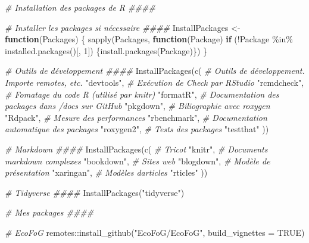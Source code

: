 \documentclass[
  11pt,
  french,
  a4paper,
  extrafontsizes,onecolumn,openright
  ]{memoir}
\newenvironment{Shaded}{\begin{snugshade}}{\end{snugshade}}
\newcommand{\AttributeTok}[1]{\textcolor[rgb]{0.77,0.63,0.00}{#1}}
\newcommand{\CommentTok}[1]{\textcolor[rgb]{0.56,0.35,0.01}{\textit{#1}}}
\newcommand{\ConstantTok}[1]{\textcolor[rgb]{0.00,0.00,0.00}{#1}}
\newcommand{\ControlFlowTok}[1]{\textcolor[rgb]{0.13,0.29,0.53}{\textbf{#1}}}
\newcommand{\DecValTok}[1]{\textcolor[rgb]{0.00,0.00,0.81}{#1}}
\newcommand{\FunctionTok}[1]{\textcolor[rgb]{0.00,0.00,0.00}{#1}}
\newcommand{\NormalTok}[1]{#1}
\newcommand{\OtherTok}[1]{\textcolor[rgb]{0.56,0.35,0.01}{#1}}
\newcommand{\SpecialCharTok}[1]{\textcolor[rgb]{0.00,0.00,0.00}{#1}}
\newcommand{\StringTok}[1]{\textcolor[rgb]{0.31,0.60,0.02}{#1}}
\begin{document}
\begin{Shaded}
\begin{Highlighting}[]
\CommentTok{\# Installation des packages de R \#\#\#\#}

\CommentTok{\# Installer les packages si nécessaire \#\#\#\#}
\NormalTok{InstallPackages }\OtherTok{\textless{}{-}} \ControlFlowTok{function}\NormalTok{(Packages) \{}
  \FunctionTok{sapply}\NormalTok{(Packages, }\ControlFlowTok{function}\NormalTok{(Package) }
    \ControlFlowTok{if}\NormalTok{ (}\SpecialCharTok{!}\NormalTok{Package }\SpecialCharTok{\%in\%} \FunctionTok{installed.packages}\NormalTok{()[, }\DecValTok{1}\NormalTok{]) }
\NormalTok{      \{}\FunctionTok{install.packages}\NormalTok{(Package)\})}
\NormalTok{\}}


\CommentTok{\# Outils de développement \#\#\#\#}
\FunctionTok{InstallPackages}\NormalTok{(}\FunctionTok{c}\NormalTok{(}
  \CommentTok{\# Outils de développement. Importe remotes, etc.}
  \StringTok{"devtools"}\NormalTok{,}
  \CommentTok{\# Exécution de Check par RStudio}
  \StringTok{"rcmdcheck"}\NormalTok{,}
  \CommentTok{\# Fomatage du code R (utilisé par knitr)}
  \StringTok{"formatR"}\NormalTok{,}
  \CommentTok{\# Documentation des packages dans /docs sur GitHub}
  \StringTok{"pkgdown"}\NormalTok{,}
  \CommentTok{\# Biliographie avec roxygen}
  \StringTok{"Rdpack"}\NormalTok{,}
  \CommentTok{\# Mesure des performances}
  \StringTok{"rbenchmark"}\NormalTok{,}
  \CommentTok{\# Documentation automatique des packages}
  \StringTok{"roxygen2"}\NormalTok{,}
  \CommentTok{\# Tests des packages}
  \StringTok{"testthat"}
\NormalTok{  ))}

\CommentTok{\# Markdown \#\#\#\#}
\FunctionTok{InstallPackages}\NormalTok{(}\FunctionTok{c}\NormalTok{(}
  \CommentTok{\# Tricot}
  \StringTok{"knitr"}\NormalTok{,}
  \CommentTok{\# Documents markdown complexes}
  \StringTok{"bookdown"}\NormalTok{,}
  \CommentTok{\# Sites web}
  \StringTok{"blogdown"}\NormalTok{,}
  \CommentTok{\# Modèle de présentation}
  \StringTok{"xaringan"}\NormalTok{,}
  \CommentTok{\# Modèles d\textquotesingle{}articles}
  \StringTok{"rticles"}     
\NormalTok{  ))}


\CommentTok{\# Tidyverse \#\#\#\#}
\FunctionTok{InstallPackages}\NormalTok{(}\StringTok{"tidyverse"}\NormalTok{)}


\CommentTok{\# Mes packages \#\#\#\#}

\CommentTok{\# EcoFoG}
\NormalTok{remotes}\SpecialCharTok{::}\FunctionTok{install\_github}\NormalTok{(}\StringTok{"EcoFoG/EcoFoG"}\NormalTok{, }
                        \AttributeTok{build\_vignettes =} \ConstantTok{TRUE}\NormalTok{)}
\end{Highlighting}
\end{Shaded}
\end{document}
